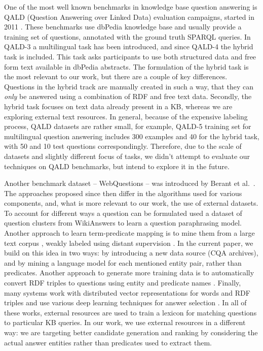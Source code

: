One of the most well known benchmarks in knowledge base question answering is QALD (Question Answering over Linked Data) evaluation campaigns, started in 2011 \cite{UngerFLNCCW15}.
These benchmarks use dbPedia knowledge base and usually provide a training set of questions, annotated with the ground truth SPARQL queries.
In QALD-3 a multilingual task has been introduced, and since QALD-4 the hybrid task is included.
This task asks participants to use both structured data and free form text available in dbPedia abstracts.
The formulation of the hybrid task is the most relevant to our work, but there are a couple of key differences.
Questions in the hybrid track are manually created in such a way, that they can \textit{only} be answered using a combination of RDF and free text data.
Secondly, the hybrid task focuses on text data already present in a KB, whereas we are exploring external text resources.
In general, because of the expensive labeling process, QALD datasets are rather small, for example, QALD-5 training set for multilingual question answering includes 300 examples and 40 for the hybrid task, with 50 and 10 test questions correspondingly.
Therefore, due to the scale of datasets and slightly different focus of tasks, we didn't attempt to evaluate our techniques on QALD benchmarks, but intend to explore it in the future.

Another benchmark dataset -- WebQuestions -- was introduced by Berant et al.~\cite{Berant:EMNLP13}.
The approaches proposed since then differ in the algorithms used for various components, and, what is more relevant to our work, the use of external datasets.
To account for different ways a question can be formulated \cite{berant2014semantic} used a dataset of question clusters from WikiAnswers to learn a question paraphrasing model.
Another approach to learn term-predicate mapping is to mine them from a large text corpus \cite{yao2014information}, weakly labeled using distant supervision \cite{mintz2009distant}.
In the current paper, we build on this idea in two ways: by introducing a new data source (CQA archives), and by mining a language model for each mentioned entity pair, rather than predicates.
Another approach to generate more training data is to automatically convert RDF triples to questions using entity and predicate names \cite{BordesCW14:emnlp}.
Finally, many systems work with distributed vector representations for words and RDF triples and use various deep learning techniques for answer selection \cite{BordesCW14:emnlp,yih2015semantic}.
In all of these works, external resources are used to train a lexicon for matching questions to particular KB queries.
In our work, we use external resources in a different way: we are targeting better candidate generation and ranking by considering the actual answer entities rather than predicates used to extract them.

